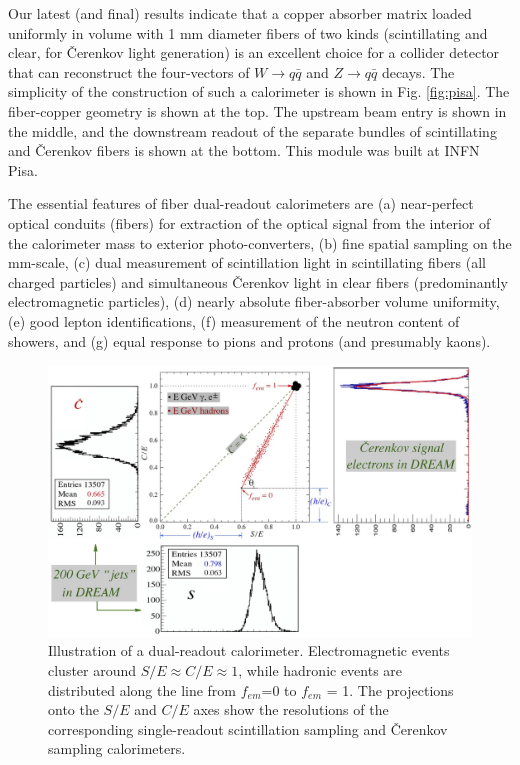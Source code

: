 Our latest (and final) results indicate that a copper absorber matrix loaded uniformly in volume with 1 mm diameter
fibers of two kinds (scintillating and clear, for \v{C}er\-enk\-ov light generation) is an excellent choice for a collider detector that 
can reconstruct the four-vectors of $W \rightarrow q\bar{q}$ and  $Z \rightarrow q\bar{q}$ decays.  The simplicity of the construction of such a calorimeter is shown in Fig. \ref{fig:pisa}.  The fiber-copper geometry is shown at the top.  The upstream beam entry is shown in the middle, and the downstream readout of the separate bundles of  scintillating and \v{C}er\-enk\-ov fibers is shown at the bottom.  This module was built at INFN Pisa.

The essential features of  fiber dual-readout calorimeters are (a) near-perfect optical conduits (fib\-ers)
for extraction of the optical signal from the interior of the calorimeter mass to exterior photo-convert\-ers, 
(b) fine spatial sampling on the mm-scale, (c) dual measurement of scintillation light in scintillating
fibers (all charged particles) and simultaneous \v{C}er\-enk\-ov light in clear fibers (predominantly electromagnetic
particles), (d) nearly absolute fiber-absorber volume uniformity, (e) good lepton identifications, (f) measurement of the neutron content of showers, and (g) equal response to pions and protons (and presumably kaons).
 
 
\begin{figure}
 \centering
 \includegraphics[scale=0.18]{Calorimeter/DualReadout/groom-plot-projs.jpg}
  \caption{Illustration of a dual-readout calorimeter.  Electromagnetic events cluster around $S/E\approx C/E \approx 1$,
  while hadronic events are distributed along the line from $f_{em}$=0 to $f_{em}$ = 1.  The projections onto the $S/E$ and $C/E$
  axes show the resolutions of the corresponding single-readout scintillation sampling and \v{C}er\-enk\-ov sampling calorimeters.}  
  \label{fig:groom}
\end{figure}

